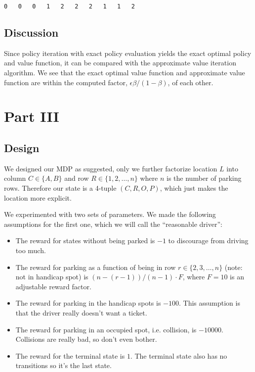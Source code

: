 \documentclass[paper=a4, fontsize=11pt]{scrartcl}
\begin{document}
\begin{verbatim}
0	0	0	1	2	2	2	1	1	2
\end{verbatim}

\subsection{Discussion}

Since policy iteration with exact policy evaluation yields the exact optimal policy and value function, it can be compared with the approximate value iteration algorithm. We see that the exact optimal value function and approximate value function are within the computed factor, $\epsilon \beta / (1 - \beta)$, of each other.

\section{Part III}

\subsection{Design}

We designed our MDP as suggested, only we further factorize location $L$ into column $C \in \{A, B\}$ and row $R \in \{1, 2, \ldots, n\}$ where $n$ is the number of parking rows. Therefore our state is a 4-tuple $(C, R, O, P)$, which just makes the location more explicit.

We experimented with two sets of parameters. We made the following assumptions for the first one, which we will call the ``reasonable driver'':

\begin{itemize}
\item The reward for states without being parked is $-1$ to discourage from driving too much.
\item The reward for parking as a function of being in row $r \in \{2, 3, \ldots, n\}$ (note: not in handicap spot) is $(n-(r-1))/(n-1) \cdot F$, where $F=10$ is an adjustable reward factor.
\item The reward for parking in the handicap spots is $-100$. This assumption is that the driver really doesn't want a ticket.
\item The reward for parking in an occupied spot, i.e. collision, is $-10000$. Collisions are really bad, so don't even bother.
\item The reward for the terminal state is $1$. The terminal state also has no transitions so it's the last state.
\end{itemize}
\end{document}
